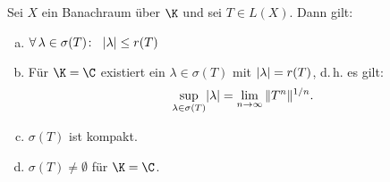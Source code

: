 \begin{thSatz} \label{vl20:satz8.11}
    Sei $X$ ein Banachraum über $\K$ und sei $T\in L(X)$. Dann gilt:
    \begin{enumerate}[(a)]
        \item \label{vl20:satz8.11:a}
            $\forall\,\lambda\in\sigma(T)\colon\;\;
            \lvert\lambda\rvert \leq r(T)$
        
        \item \label{vl20:satz8.11:b}
            Für $\K=\C$ existiert ein $\lambda\in\sigma(T)$ mit
            $\lvert\lambda\rvert = r(T)$, d.\,h. es gilt: 
            \[ \sup_{\lambda\in\sigma(T)}\lvert\lambda\rvert
            = \lim_{n\to\infty}\,\lVert T^n\rVert^{1/n} . \]
        
        \item \label{vl20:satz8.11:c}
            $\sigma(T)$ ist kompakt.
            
        \item \label{vl20:satz8.11:d}
            $\sigma(T) \neq \emptyset$ für $\K=\C$.
    \end{enumerate}
\end{thSatz}

